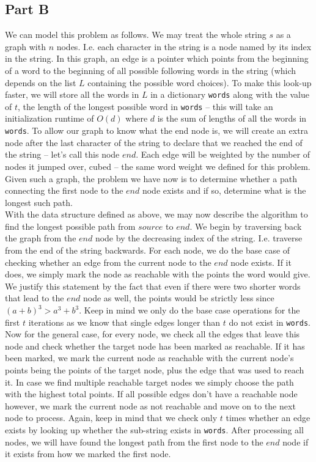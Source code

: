 \documentclass[12pt,twoside]{article}
\begin{document}
\begin{problems}
\section*{Part B}
\problem %
\begin{problemparts}

\problempart %
We can model this problem as follows. We may treat the whole string $s$ as a graph with $n$ nodes. I.e. each character in the string is a node named by its index in the string. In this graph, an edge is a pointer which points from the beginning of a word to the beginning of all possible following words in the string (which depends on the list $L$ containing the possible word choices). To make this look-up faster, we will store all the words in $L$ in a dictionary {\tt words} along with the value of $t$, the length of the longest possible word in {\tt words} -- this will take an initialization runtime of $O(d)$ where $d$ is the sum of lengths of all the words in {\tt words}. To allow our graph to know what the end node is, we will create an extra node after the last character of the string to declare that we reached the end of the string -- let's call this node $end$. Each edge will be weighted by the number of nodes it jumped over, cubed -- the same word weight we defined for this problem. Given such a graph, the problem we have now is to determine whether a path connecting the first node to the $end$ node exists and if so, determine what is the longest such path.\\

With the data structure defined as above, we may now describe the algorithm to find the longest possible path from $source$ to $end$. We begin by traversing back the graph from the $end$ node by the decreasing index of the string. I.e. traverse from the end of the string backwards. For each node, we do the base case of checking whether an edge from the current node to the $end$ node exists. If it does, we simply mark the node as reachable with the points the word would give. We justify this statement by the fact that even if there were two shorter words that lead to the $end$ node as well, the points would be strictly less since $(a + b)^3 > a^3 + b^3$. Keep in mind we only do the base case operations for the first $t$ iterations as we know that single edges longer than $t$ do not exist in {\tt words}. Now for the general case, for every node, we check all the edges that leave this node and check whether the target node has been marked as reachable. If it has been marked, we mark the current node as reachable with the current node's points being the points of the target node, plus the edge that was used to reach it. In case we find multiple reachable target nodes we simply choose the path with the highest total points. If all possible edges don't have a reachable node however, we mark the current node as not reachable and move on to the next node to process. Again, keep in mind that we check only $t$ times whether an edge exists by looking up whether the sub-string exists in {\tt words}. After processing all nodes, we will have found the longest path from the first node to the $end$ node if it exists from how we marked the first node.\\


\end{problemparts}
\end{problems}
\end{document}
